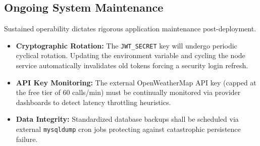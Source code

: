 \subsection{Ongoing System Maintenance}
Sustained operability dictates rigorous application maintenance post-deployment.
\begin{itemize}
    \item \textbf{Cryptographic Rotation:} The \texttt{JWT\_SECRET} key will undergo periodic cyclical rotation. Updating the environment variable and cycling the node service automatically invalidates old tokens forcing a security login refresh.
    \item \textbf{API Key Monitoring:} The external OpenWeatherMap API key (capped at the free tier of 60 calls/min) must be continually monitored via provider dashboards to detect latency throttling heuristics.
    \item \textbf{Data Integrity:} Standardized database backups shall be scheduled via external \texttt{mysqldump} cron jobs protecting against catastrophic persistence failure.
\end{itemize}
